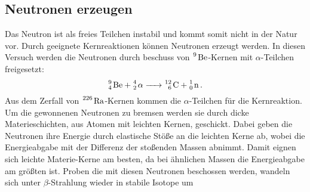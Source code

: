 \subsection{Neutronen erzeugen}
Das Neutron ist als freies Teilchen instabil und kommt somit nicht in der Natur vor. Durch geeignete Kernreaktionen können Neutronen erzeugt werden.
In diesen Versuch werden die Neutronen durch beschuss von $\ce{^9 Be}$-Kernen mit $\alpha$-Teilchen freigesetzt:
\begin{equation*}
    \ce{ ^9_4 Be + ^4_2 $\alpha$ -> ^{12}_6 C + ^1_0 n} \, .
\end{equation*}
Aus dem Zerfall von $\ce{^226 Ra}$-Kernen kommen die $\alpha$-Teilchen für die Kernreaktion. 
Um die gewonnenen Neutronen zu bremsen werden sie durch dicke Materieschichten, aus Atomen mit leichten Kernen, geschickt.
Dabei geben die Neutronen ihre Energie durch elastische Stöße an die leichten Kerne ab, wobei die Energieabgabe mit der Differenz der stoßenden Massen abnimmt.
Damit eignen sich leichte Materie-Kerne am besten, da bei ähnlichen Massen die Energieabgabe am größten ist.
Proben die mit diesen Neutronen beschossen werden, wandeln sich unter $\beta$-Strahlung wieder in stabile Isotope um
